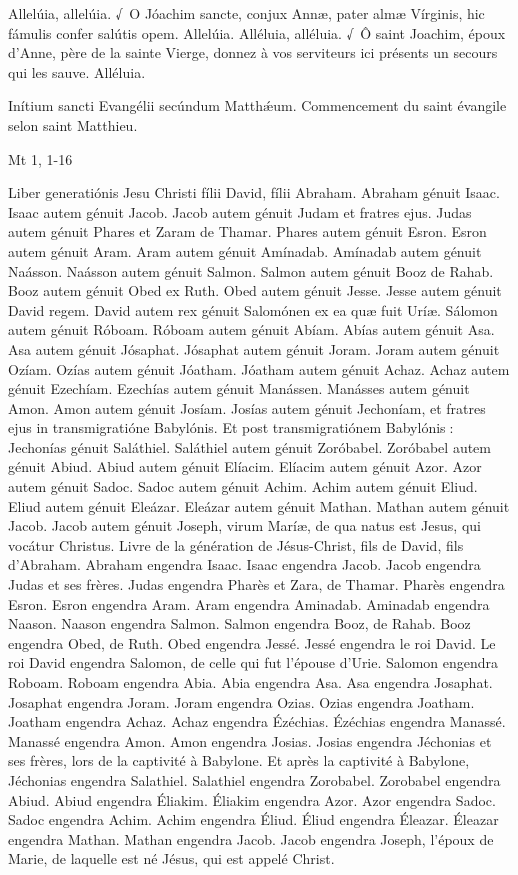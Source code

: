 \begin{paracol}{2}
Allelúia, allelúia. √~O Jóachim sancte, conjux Annæ, pater almæ Vírginis, hic fámulis confer salútis opem. Allelúia.
\switchcolumn
Alléluia, alléluia. √~Ô saint Joachim, époux d’Anne, père de la sainte Vierge, donnez à vos serviteurs ici présents un secours qui les sauve. Alléluia.
\switchcolumn*

Inítium sancti Evangélii secúndum Matthǽum.
\switchcolumn
Commencement du saint évangile selon saint Matthieu.
\switchcolumn*

Mt 1, 1-16
\switchcolumn

\switchcolumn*

Liber generatiónis Jesu Christi fílii  David, fílii Abraham. Abraham génuit Isaac. Isaac autem génuit Jacob. Jacob autem génuit Judam et fratres ejus. Judas autem génuit Phares et Zaram de Thamar. Phares autem génuit Esron. Esron autem génuit Aram. Aram autem génuit Amínadab. Amínadab autem génuit Naásson. Naásson autem génuit Salmon. Salmon autem génuit Booz de Rahab. Booz autem génuit Obed ex Ruth. Obed autem génuit Jesse. Jesse autem génuit David regem. David autem rex génuit Salomónen ex ea quæ fuit Uríæ. Sálomon autem génuit Róboam. Róboam autem génuit Abíam. Abías autem génuit Asa. Asa autem génuit Jósaphat. Jósaphat autem génuit Joram. Joram autem génuit Ozíam. Ozías autem génuit Jóatham. Jóatham autem génuit Achaz. Achaz autem génuit Ezechíam. Ezechías autem génuit Manássen. Manásses autem génuit Amon. Amon autem génuit Josíam. Josías autem génuit Jechoníam, et fratres ejus in transmigratióne Babylónis. Et post transmigratiónem Babylónis : Jechonías génuit Saláthiel. Saláthiel autem génuit Zoróbabel. Zoróbabel autem génuit Abiud. Abiud autem génuit Elíacim. Elíacim autem génuit Azor. Azor autem génuit Sadoc. Sadoc autem génuit Achim. Achim autem génuit Eliud. Eliud autem génuit Eleázar. Eleázar autem génuit Mathan. Mathan autem génuit Jacob. Jacob autem génuit Joseph, virum Maríæ, de qua natus est Jesus, qui vocátur Christus.
\switchcolumn
Livre de la génération de Jésus-Christ,  fils de David, fils d’Abraham. Abraham engendra Isaac. Isaac engendra Jacob. Jacob engendra Judas et ses frères. Judas engendra Pharès et Zara, de Thamar. Pharès engendra Esron. Esron engendra Aram. Aram engendra Aminadab. Aminadab engendra Naason. Naason engendra Salmon. Salmon engendra Booz, de Rahab. Booz engendra Obed, de Ruth. Obed engendra Jessé. Jessé engendra le roi David. Le roi David engendra Salomon, de celle qui fut l’épouse d’Urie. Salomon engendra Roboam. Roboam engendra Abia. Abia engendra Asa. Asa engendra Josaphat. Josaphat engendra Joram. Joram engendra Ozias. Ozias engendra Joatham. Joatham engendra Achaz. Achaz engendra Ézéchias. Ézéchias engendra Manassé. Manassé engendra Amon. Amon engendra Josias. Josias engendra Jéchonias et ses frères, lors de la captivité à Babylone. Et après la captivité à Babylone, Jéchonias engendra Salathiel. Salathiel engendra Zorobabel. Zorobabel engendra Abiud. Abiud engendra Éliakim. Éliakim engendra Azor. Azor engendra Sadoc. Sadoc engendra Achim. Achim engendra Éliud. Éliud engendra Éleazar. Éleazar engendra Mathan. Mathan engendra Jacob. Jacob engendra Joseph, l’époux de Marie, de laquelle est né Jésus, qui est appelé Christ.
\switchcolumn*


\end{paracol}
